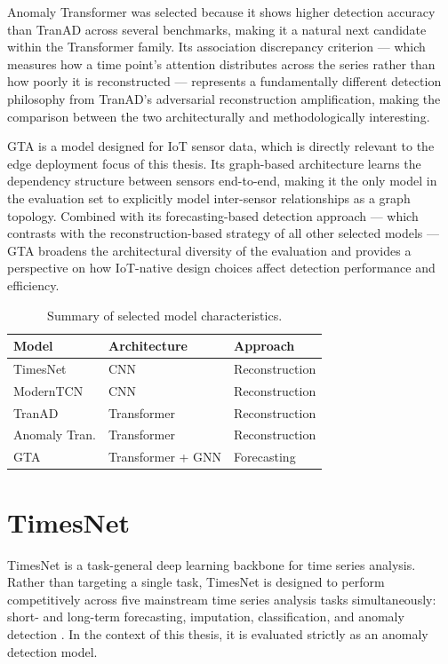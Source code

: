 \documentclass[twoside,11pt,openright]{report}
\begin{document}
Anomaly Transformer \citep{anomalytransformer2022} was selected because it shows 
higher detection accuracy than TranAD across several benchmarks, making it a 
natural next candidate within the Transformer family. Its association discrepancy 
criterion --- which measures how a time point's attention distributes across the series 
rather than how poorly it is reconstructed --- represents a fundamentally different 
detection philosophy from TranAD's adversarial reconstruction amplification, making the 
comparison between the two architecturally and methodologically interesting.

GTA \citep{gta2022} is a model designed for IoT sensor 
data, which is directly relevant to the edge deployment focus of this thesis. Its 
graph-based architecture learns the dependency structure between sensors end-to-end, 
making it the only model in the evaluation set to explicitly model inter-sensor 
relationships as a graph topology. Combined with its forecasting-based detection 
approach --- which contrasts with the reconstruction-based strategy of all other 
selected models --- GTA broadens the architectural diversity of the evaluation and 
provides a perspective on how IoT-native design choices affect detection performance 
and efficiency.

\begin{table}[ht]
\centering
\caption{Summary of selected model characteristics.}
\label{tab:model_summary}
\begin{tabular}{lll}
\toprule
\textbf{Model} & \textbf{Architecture} & \textbf{Approach} \\
\midrule
TimesNet \citep{timesnet2023}              & CNN               & Reconstruction \\
ModernTCN \citep{moderntcn2024}            & CNN               & Reconstruction \\
TranAD \citep{tranad2022}                  & Transformer       & Reconstruction \\
Anomaly Tran. \citep{anomalytransformer2022} & Transformer     & Reconstruction \\
GTA \citep{gta2022}                        & Transformer + GNN & Forecasting    \\
\bottomrule
\end{tabular}
\end{table}

\section{TimesNet}
TimesNet \citep{timesnet2023} is a task-general deep learning backbone for time series
analysis. Rather than targeting a single task, TimesNet is designed to perform competitively across five mainstream time
series analysis tasks simultaneously: short- and long-term forecasting, imputation,
classification, and anomaly detection \citep{timesnet2023}. In the context of this
thesis, it is evaluated strictly as an anomaly detection model.
\end{document}
